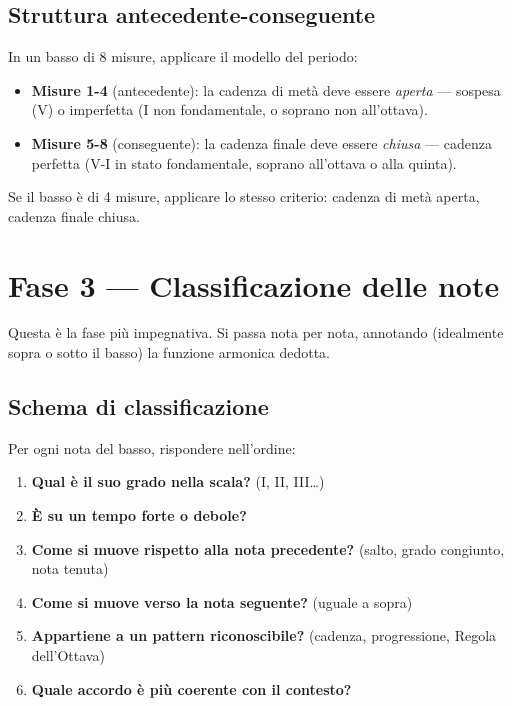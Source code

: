\subsection{Struttura antecedente-conseguente}

In un basso di 8 misure, applicare il modello del periodo:
\begin{itemize}
	\item \textbf{Misure 1-4} (antecedente): la cadenza di metà deve essere \textit{aperta} --- sospesa (V) o imperfetta (I non fondamentale, o soprano non all'ottava).
	\item \textbf{Misure 5-8} (conseguente): la cadenza finale deve essere \textit{chiusa} --- cadenza perfetta (V-I in stato fondamentale, soprano all'ottava o alla quinta).
\end{itemize}

Se il basso è di 4 misure, applicare lo stesso criterio: cadenza di metà aperta, cadenza finale chiusa.

\section{Fase 3 — Classificazione delle note}
\label{sec:fase3_basso}

Questa è la fase più impegnativa. Si passa nota per nota, annotando (idealmente sopra o sotto il basso) la funzione armonica dedotta.

\subsection{Schema di classificazione}

Per ogni nota del basso, rispondere nell'ordine:

\begin{enumerate}
	\item \textbf{Qual è il suo grado nella scala?} (I, II, III\ldots)
	\item \textbf{È su un tempo forte o debole?}
	\item \textbf{Come si muove rispetto alla nota precedente?} (salto, grado congiunto, nota tenuta)
	\item \textbf{Come si muove verso la nota seguente?} (uguale a sopra)
	\item \textbf{Appartiene a un pattern riconoscibile?} (cadenza, progressione, Regola dell'Ottava)
	\item \textbf{Quale accordo è più coerente con il contesto?}
\end{enumerate}

